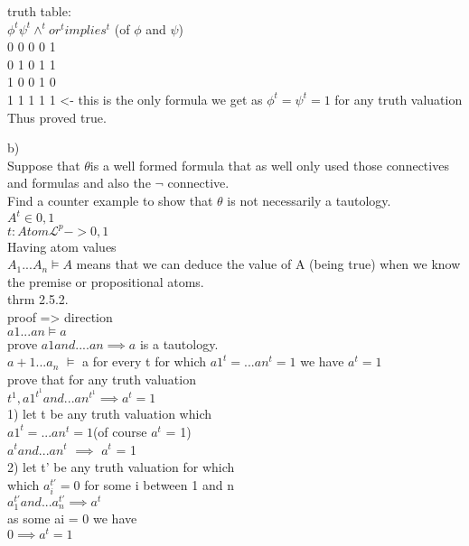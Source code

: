 \documentclass[12pt,oneside,fleqn]{article}
\theoremstyle{definition}
\newcommand{\Lp}{\mathcal{L}^p}
\begin{document}
truth table: \\
$\phi^t \psi^t \land^t or^t implies^t$ (of $\phi$ and $\psi$) \\
0 0 0 0 1 \\
0 1 0 1 1 \\
1 0 0 1 0 \\
1 1 1 1 1 <- this is the only formula we get as $\phi^t = \psi^t = 1$ for any truth valuation \\
Thus proved true.

b) \\
Suppose that $\theta $is a well formed formula that as well only used those connectives and formulas and also the $\neg$ connective. \\
Find a counter example to show that $\theta$ is not necessarily a tautology. \\
$A^t \in { 0 , 1}$ \\ 
$t: Atom \Lp -> { 0, 1 }$ \\

Having atom values \\
$A_1...A_n \models A$ means that we can deduce the value of A (being true) when we know the premise or propositional atoms. \\

thrm 2.5.2. \\
proof => direction \\
$a1...an \models a$ \\
prove $a1 and .... an \implies a$ is a tautology. \\

$a+1 ... a_n$ $\vDash$ a for every t  for which $a1^t = ... an^t = 1$ we have $a^t = 1$ \\

prove that for any truth valuation \\
$t^1, a1^{t^1} and ... an^{t^1} \implies a^t = 1$ \\

1) let t be any truth valuation which \\ 
$a1^t = ... an^t = 1$(of course $a^t$ = 1) \\
$a^t and ... an^t$ $\implies$ $a^t$ = 1 \\
2) let t' be any truth valuation for which \\ 
which $a_{i}^{t'} = 0$ for some i between 1 and n \\
$a_{1}^{t'} and ... a_n^{t'} \implies a^t$ \\
as some ai = 0 we have \\
$0 \implies a^t = 1$ \\
\end{document}
